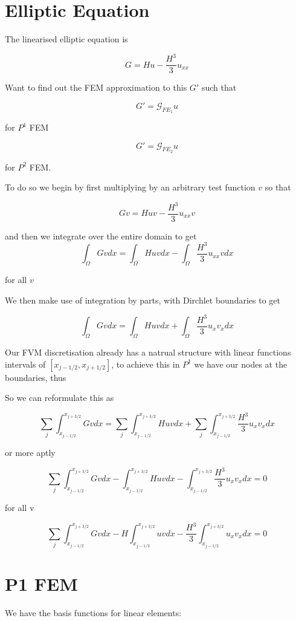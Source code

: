 \documentclass[12pt]{article}
\begin{document}
\section{Elliptic Equation}
The linearised elliptic equation is

\[G = Hu - \frac{H^3}{3}u_{xx}\]

Want to find out the FEM approximation to this $G'$ such that

\[G' = \mathcal{G}_{FE_1} u\]

for $P^1$ FEM

\[G' = \mathcal{G}_{FE_2} u\]

for $P^2$ FEM.

To do so we begin by first multiplying by an arbitrary test function $v$ so that

\[Gv = Huv - \frac{H^3}{3}u_{xx}v\]

and then we integrate over the entire domain to get 
\[\int_\Omega Gv dx = \int_\Omega Huv dx - \int_\Omega \frac{H^3}{3}u_{xx}vdx\]

for all $v$

We then make use of integration by parts, with Dirchlet boundaries to get

\[\int_\Omega Gv dx = \int_\Omega Huv dx + \int_\Omega \frac{H^3}{3}u_{x}v_xdx\]

Our FVM discretisation already has a natrual structure with linear functions intervals of $[x_{j- 1/2} , x_{j+1/2}]$, to achieve this in $P^1$ we have our nodes at the boundaries, thus

So we can reformulate this as 

\[\sum_{j}\int_{x_{j-1/2}}^{x_{j+3/2}} Gv dx = \sum_{j}\int_{x_{j-1/2}}^{x_{j+3/2}} Huv dx + \sum_{j}\int_{x_{j-1/2}}^{x_{j+3/2}} \frac{H^3}{3}u_{x}v_{x}dx\]

or more aptly

\[\sum_{j}\int_{x_{j-1/2}}^{x_{j+3/2}} Gv dx - \int_{x_{j-1/2}}^{x_{j+3/2}} Huv dx - \int_{x_{j-1/2}}^{x_{j+3/2}} \frac{H^3}{3}u_{x}v_{x}dx = 0 \]

for all v

\[\sum_{j}\int_{x_{j-1/2}}^{x_{j+3/2}} Gv dx - H\int_{x_{j-1/2}}^{x_{j+3/2}} uv dx -  \frac{H^3}{3}\int_{x_{j-1/2}}^{x_{j+3/2}}u_{x}v_{x}dx = 0 \]

\section{P1 FEM}
We have the basis functions for linear elements:
\end{document}
